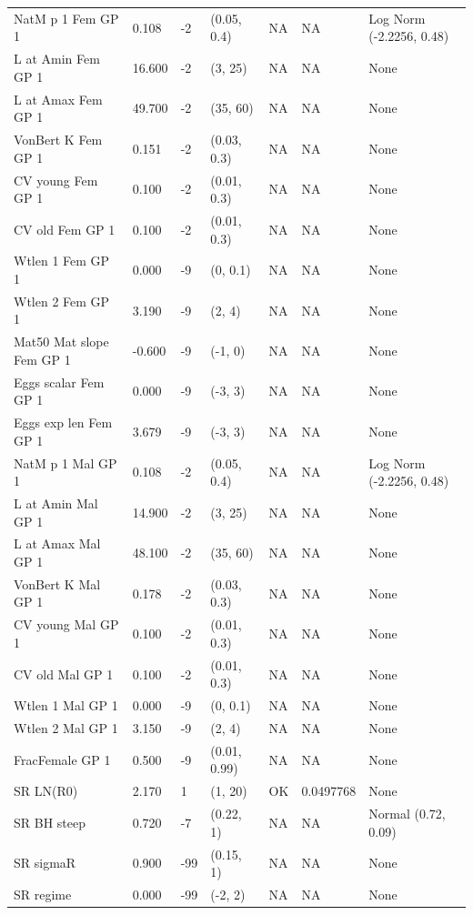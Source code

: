\documentclass[11pt,
  english,
  a4paper,
]{article}
\begin{document}
\begin{landscape}
\begin{longtable}[t]{>{\raggedright\arraybackslash}p{6cm}lllll>{\raggedright\arraybackslash}p{4cm}}
\endfoot
\bottomrule
\endlastfoot
NatM p 1 Fem GP 1 & 0.108 & -2 & (0.05, 0.4) & NA & NA & Log Norm (-2.2256, 0.48)\\
L at Amin Fem GP 1 & 16.600 & -2 & (3, 25) & NA & NA & None\\
L at Amax Fem GP 1 & 49.700 & -2 & (35, 60) & NA & NA & None\\
VonBert K Fem GP 1 & 0.151 & -2 & (0.03, 0.3) & NA & NA & None\\
CV young Fem GP 1 & 0.100 & -2 & (0.01, 0.3) & NA & NA & None\\
CV old Fem GP 1 & 0.100 & -2 & (0.01, 0.3) & NA & NA & None\\
Wtlen 1 Fem GP 1 & 0.000 & -9 & (0, 0.1) & NA & NA & None\\
Wtlen 2 Fem GP 1 & 3.190 & -9 & (2, 4) & NA & NA & None\\
Mat50%
Mat slope Fem GP 1 & -0.600 & -9 & (-1, 0) & NA & NA & None\\
Eggs scalar Fem GP 1 & 0.000 & -9 & (-3, 3) & NA & NA & None\\
Eggs exp len Fem GP 1 & 3.679 & -9 & (-3, 3) & NA & NA & None\\
NatM p 1 Mal GP 1 & 0.108 & -2 & (0.05, 0.4) & NA & NA & Log Norm (-2.2256, 0.48)\\
L at Amin Mal GP 1 & 14.900 & -2 & (3, 25) & NA & NA & None\\
L at Amax Mal GP 1 & 48.100 & -2 & (35, 60) & NA & NA & None\\
VonBert K Mal GP 1 & 0.178 & -2 & (0.03, 0.3) & NA & NA & None\\
CV young Mal GP 1 & 0.100 & -2 & (0.01, 0.3) & NA & NA & None\\
CV old Mal GP 1 & 0.100 & -2 & (0.01, 0.3) & NA & NA & None\\
Wtlen 1 Mal GP 1 & 0.000 & -9 & (0, 0.1) & NA & NA & None\\
Wtlen 2 Mal GP 1 & 3.150 & -9 & (2, 4) & NA & NA & None\\
FracFemale GP 1 & 0.500 & -9 & (0.01, 0.99) & NA & NA & None\\
SR LN(R0) & 2.170 & 1 & (1, 20) & OK & 0.0497768 & None\\
SR BH steep & 0.720 & -7 & (0.22, 1) & NA & NA & Normal (0.72, 0.09)\\
SR sigmaR & 0.900 & -99 & (0.15, 1) & NA & NA & None\\
SR regime & 0.000 & -99 & (-2, 2) & NA & NA & None\\

\end{longtable}
\end{landscape}
\end{document}
